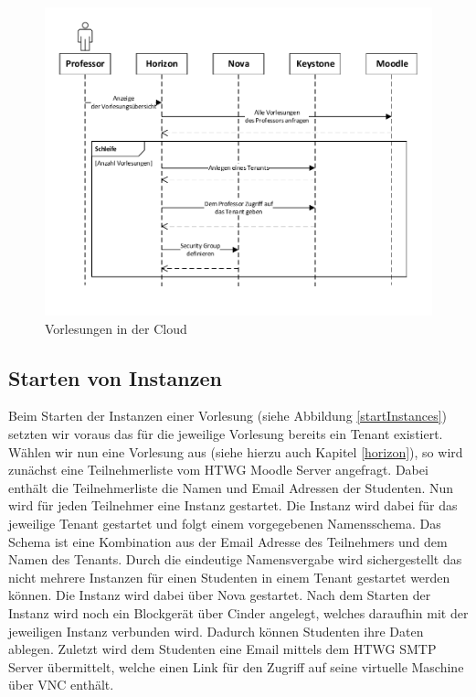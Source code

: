\begin{figure}[H]
	\centering
	\includegraphics[scale=0.7]{img/createTenants.pdf}
\caption{Vorlesungen in der Cloud}
\label{createTenants}
\FloatBarrier
\end{figure}


\subsection{Starten von Instanzen}
Beim Starten der Instanzen einer Vorlesung 
(siehe Abbildung \ref{startInstances}) setzten wir voraus das für
die jeweilige Vorlesung bereits ein Tenant existiert. Wählen wir nun eine Vorlesung aus
(siehe hierzu auch Kapitel \ref{horizon}), so wird zunächst eine Teilnehmerliste vom HTWG Moodle Server
angefragt. Dabei enthält die Teilnehmerliste die Namen und Email Adressen der Studenten.
Nun wird für jeden Teilnehmer eine Instanz gestartet. Die Instanz wird dabei für das jeweilige
Tenant gestartet und folgt einem vorgegebenen Namensschema. Das Schema ist eine Kombination
aus der Email Adresse des Teilnehmers und dem Namen des Tenants. Durch die eindeutige Namensvergabe
wird sichergestellt das nicht mehrere Instanzen für einen Studenten in einem Tenant gestartet
werden können.
Die Instanz wird dabei über Nova gestartet. Nach dem Starten der Instanz wird noch ein Blockgerät
über Cinder angelegt, welches daraufhin mit der jeweiligen Instanz verbunden wird. Dadurch können
Studenten ihre Daten ablegen.
Zuletzt wird dem Studenten eine Email mittels dem HTWG SMTP Server übermittelt, welche einen
Link für den Zugriff auf seine virtuelle Maschine über VNC enthält.

